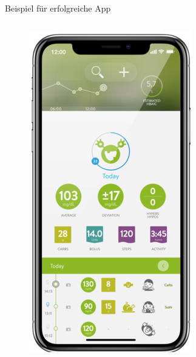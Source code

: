 \documentclass[aspectratio=169,t]{beamer}
\begin{document}
\begin{frame}{Beispiel für erfolgreiche App}
\begin{columns}
\begin{column}{0.6\textwidth}
\begin{figure}
\begin{minipage}{0.33\textwidth}
                    \includegraphics[width=\textwidth]{Bilder/mysugr2.png}
                \end{minipage}%
                \begin{minipage}{0.33\textwidth}

\end{minipage}
\end{figure}
\end{column}
\end{columns}
\end{frame}
\end{document}
